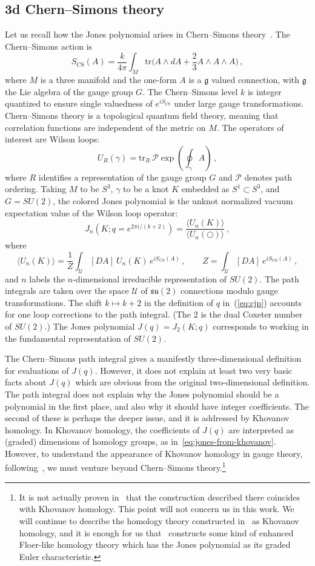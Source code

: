 \documentclass[11pt]{article}
\newcommand\be{\begin{equation}}
\newcommand\ee{\end{equation}}
\newcommand\eref[1]{(\ref{#1})}
\newcommand\tr{\text{tr}}
\newcommand\vev[1]{\langle #1 \rangle}
\numberwithin{equation}{section}
\begin{document}
\subsection{3d Chern--Simons theory}
Let us recall how the Jones polynomial arises in Chern--Simons theory~\cite{Witten:1988hf}.
The Chern--Simons action is
\be
S_\text{CS}(A) = \frac{k}{4\pi} \int_M \tr \big( A\wedge dA + \frac23 A\wedge A\wedge A \big) \,,
\ee
where $M$ is a three manifold and the one-form $A$ is a $\mathfrak{g}$ valued connection, with $\mathfrak{g}$ the Lie algebra of the gauge group $G$.
The Chern--Simons level $k$ is integer quantized to ensure single valuedness of $e^{iS_\text{CS}}$ under large gauge transformations.
Chern--Simons theory is a topological quantum field theory, meaning that correlation functions are independent of the metric on $M$.
The operators of interest are Wilson loops:
\be
U_R(\gamma) = \tr_R\ \mathcal{P} \exp \left( \oint_\gamma A \right) \,,
\ee
where $R$ identifies a representation of the gauge group $G$ and $\mathcal{P}$ denotes path ordering.
Taking $M$ to be $S^3$, $\gamma$ to be a knot $K$ embedded as $S^1 \subset S^3$, and $G=SU(2)$, the colored Jones polynomial is the unknot normalized vacuum expectation value of the Wilson loop operator:
\be
J_n(K;q=e^{2\pi i/(k+2)}) = \frac{\vev{U_n(K)}}{\vev{U_n(\bigcirc)}} \,, \label{eq:cjp}
\ee
where
\be
\vev{U_n(K)} = \frac1Z \int_\mathcal{U} [DA]\ U_n(K)\, e^{i S_\text{CS}(A)} \,, \qquad
Z = \int_\mathcal{U} [DA]\ e^{i S_\text{CS}(A)} \,,
\ee
and $n$ labels the $n$-dimensional irreducible representation of $SU(2)$.
The path integrals are taken over the space $\mathcal{U}$ of $\mathfrak{su}(2)$ connections modulo gauge transformations.
The shift $k\mapsto k+2$ in the definition of $q$ in~\eref{eq:cjp} accounts for one loop corrections to the path integral.
(The $2$ is the dual Coxeter number of $SU(2)$.)
The Jones polynomial $J(q) = J_2(K;q)$ corresponds to working in the fundamental representation of $SU(2)$.

The Chern--Simons path integral gives a manifestly three-dimensional definition for evaluations of $J(q)$.
However, it does not explain at least two very basic facts about $J(q)$ which are obvious from the original two-dimensional definition.
The path integral does not explain why the Jones polynomial should be a polynomial in the first place, and also why it should have integer coefficients.
The second of these is perhaps the deeper issue, and it is addressed by Khovanov homology.
In Khovanov homology, the coefficients of $J(q)$ are interpreted as (graded) dimensions of homology groups, as in~\eqref{eq:jones-from-khovanov}.
However, to understand the appearance of Khovanov homology in gauge theory, following~\cite{Witten:2011zz}, we must venture beyond Chern--Simons theory.\footnote{It is not actually proven in~\cite{Witten:2011zz} that the construction described there coincides with Khovanov homology.
This point will not concern us in this work.
We will continue to describe the homology theory constructed in~\cite{Witten:2011zz} as Khovanov homology, and it is enough for us that~\cite{Witten:2011zz} constructs some kind of enhanced Floer-like homology theory which has the Jones polynomial as its graded Euler characteristic.}
\end{document}

